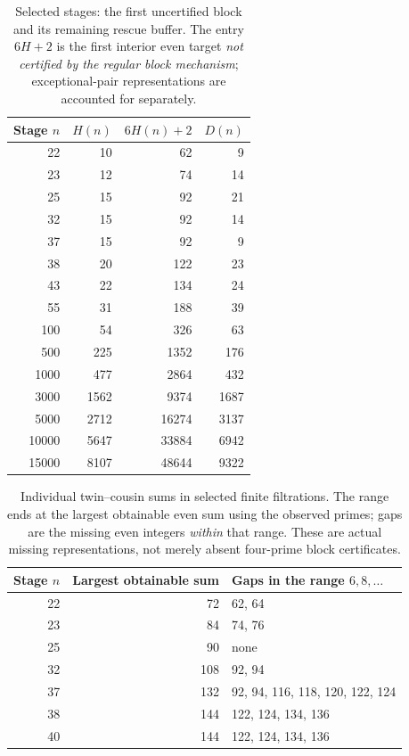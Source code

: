 \documentclass[11pt,a4paper]{article}
\numberwithin{equation}{section}
\theoremstyle{definition}
\begin{document}
\begin{table}[ht]
\centering
\caption{Selected stages: the first uncertified block and its remaining rescue buffer. The entry \(6H+2\) is the first interior even target \emph{not certified by the regular block mechanism}; exceptional-pair representations are accounted for separately.}
\label{tab:frontier}
\small
\begin{tabular}{rrrr}
\toprule
Stage \(n\)&\(H(n)\)&\(6H(n)+2\)&\(D(n)\)\\
\midrule
22&10&62&9\\
23&12&74&14\\
25&15&92&21\\
32&15&92&14\\
37&15&92&9\\
38&20&122&23\\
43&22&134&24\\
55&31&188&39\\
100&54&326&63\\
500&225&1352&176\\
1000&477&2864&432\\
3000&1562&9374&1687\\
5000&2712&16274&3137\\
10000&5647&33884&6942\\
15000&8107&48644&9322\\
\bottomrule
\end{tabular}
\end{table}

\begin{table}[ht]
\centering
\caption{Individual twin--cousin sums in selected finite filtrations. The range ends at the largest obtainable even sum using the observed primes; gaps are the missing even integers \emph{within} that range. These are actual missing representations, not merely absent four-prime block certificates.}
\label{tab:gaps}
\small
\begin{tabular}{rrl}
\toprule
Stage \(n\)&Largest obtainable sum&Gaps in the range \(6,8,\ldots\)\\
\midrule
22&72&62, 64\\
23&84&74, 76\\
25&90&none\\
32&108&92, 94\\
37&132&92, 94, 116, 118, 120, 122, 124\\
38&144&122, 124, 134, 136\\
40&144&122, 124, 134, 136\\
\bottomrule
\end{tabular}
\end{table}
\end{document}
